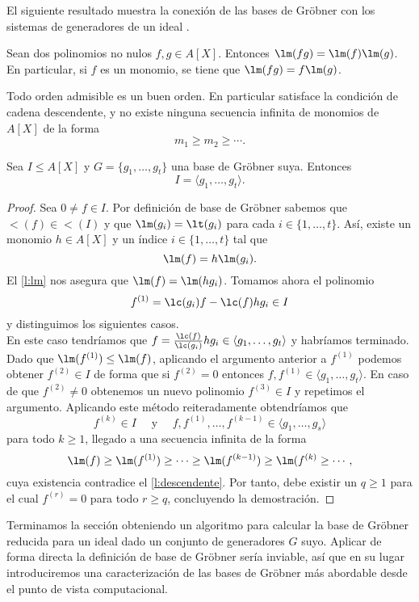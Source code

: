 El siguiente resultado muestra la conexión de las bases de Gröbner con los sistemas de generadores de un ideal \cite{grobner_generators}.
\begin{lema}\label{l:lm}
    Sean dos polinomios no nulos $f,g\in A[X]$. Entonces $\lm(fg) = \lm(f)\lm(g)$. En particular, si $f$ es un monomio, se tiene que $\lm(fg) = f\lm(g)$.
\end{lema}
\begin{lema}\label{l:descendente}
    Todo orden admisible es un buen orden. En particular satisface la condición de cadena descendente, y no existe ninguna secuencia infinita de monomios de $A[X]$ de la forma
    \begin{equation*}
        m_1 \ge m_2 \ge \cdots.
    \end{equation*}
\end{lema}
\begin{teorema}
    Sea $I\le A[X]$ y $G=\{g_1,\dots, g_t\}$ una base de Gröbner suya. Entonces
    $$I = \langle g_1,\dots, g_t\rangle.$$
\end{teorema}
\begin{proof}
    Sea $0\neq f\in I$. Por definición de base de Gröbner sabemos que $\lt(f)\in \lt(I)$ y que $\lm(g_i) = \lt(g_i)$ para cada $i\in \{1,\dots, t\}$. Así, existe un monomio $h\in A[X]$ y un índice $i\in \{1,\dots, t\}$ tal que
    $$\lm(f) = h\lm(g_i).$$
    El \autoref{l:lm} nos asegura que $\lm(f)=\lm(hg_i)$. Tomamos ahora el polinomio
    $$f^{(1)} = \lc(g_i)f - \lc(f)hg_i \in I$$
    y distinguimos los siguientes casos.\\[7pt]
     En este caso tendríamos que $f = \frac{\lc(f)}{\lc(g_i)}hg_i \in \langle g_1,\dots, g_t\rangle$ y habríamos terminado.\\[7pt]
     Dado que $\lm(f^{(1)}) \le \lm(f)$, aplicando el argumento anterior a $f^{(1)}$ podemos obtener $f^{(2)} \in I$ de forma que si $f^{(2)} = 0$ entonces $f,f^{(1)}\in \langle g_1,\dots, g_t\rangle$. En caso de que $f^{(2)}\neq 0$ obtenemos un nuevo polinomio $f^{(3)} \in I$ y repetimos el argumento. Aplicando este método reiteradamente obtendríamos que
    $$f^{(k)} \in I\quad \text{ y }\quad  f,f^{(1)},\dots, f^{(k-1)} \in \langle g_1,\dots, g_s \rangle$$
    para todo $k\ge 1$, llegado a una secuencia infinita de la forma
    \begin{equation*}
        \lm(f) \ge \lm(f^{(1)})\ge \cdots \ge \lm(f^{(k-1)})\ge \lm(f^{(k)} \ge \cdots, 
    \end{equation*}
    cuya existencia contradice el \autoref{l:descendente}. Por tanto, debe existir un $q\ge 1$ para el cual $f^{(r)} = 0$ para todo $r\ge q$, concluyendo la demostración.
\end{proof}
Terminamos la sección obteniendo un algoritmo para calcular la base de Gröbner reducida para un ideal dado un conjunto de generadores $G$ suyo. Aplicar de forma directa la definición de base de Gröbner sería inviable, así que en su lugar introduciremos una caracterización de las bases de Gröbner más abordable desde el punto de vista computacional.

